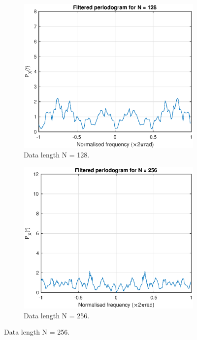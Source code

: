 \begin{figure}[H]
\begin{subfigure}{.32\textwidth}
  \centering
  \includegraphics[width=\linewidth]{assignment3figs/pgm_filt128.eps}  
  \caption{Data length N = 128.}
\end{subfigure}
\begin{subfigure}{.32\textwidth}
  \centering
  \includegraphics[width=\linewidth]{assignment3figs/pgm_filt256.eps}  
  \caption{Data length N = 256.}
\end{subfigure}

\end{figure}
